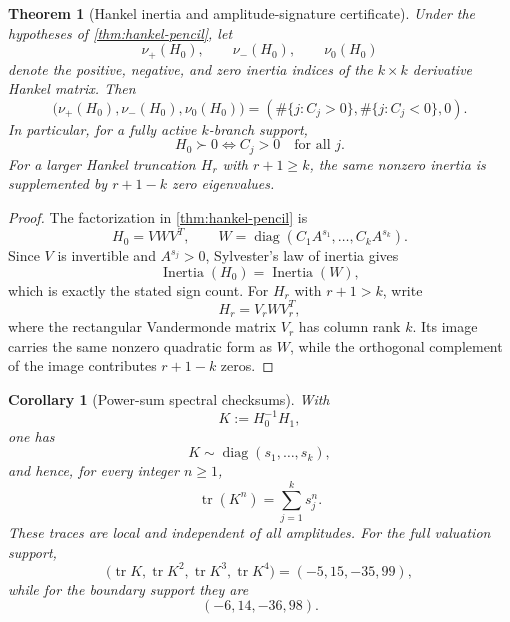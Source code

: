 \documentclass[aps,prd,reprint,onecolumn,nofootinbib,superscriptaddress,showkeys]{revtex4-2}
\numberwithin{equation}{section}
\theoremstyle{definition}
\theoremstyle{plain}
\newtheorem{theorem}{Theorem}[section]
\newtheorem{corollary}{Corollary}[section]
\newcommand{\diag}{\operatorname{diag}}
\begin{document}
\begin{theorem}[Hankel inertia and amplitude-signature certificate]\label{thm:hankel-inertia}
Under the hypotheses of \cref{thm:hankel-pencil}, let
\[
\nu_+(H_0),\qquad \nu_-(H_0),\qquad \nu_0(H_0)
\]
denote the positive, negative, and zero inertia indices of the $k\times k$ derivative Hankel matrix.  Then
\begin{equation}
\boxed{
\bigl(\nu_+(H_0),\nu_-(H_0),\nu_0(H_0)\bigr)
=
\left(
\#\{j:C_j>0\},
\#\{j:C_j<0\},
0
\right).
}
\end{equation}
In particular, for a fully active $k$-branch support,
\begin{equation}
\boxed{
H_0\succ0
\iff
C_j>0\quad\text{for all }j.
}
\end{equation}
For a larger Hankel truncation $H_r$ with $r+1\ge k$, the same nonzero inertia is supplemented by $r+1-k$ zero eigenvalues.
\end{theorem}

\begin{proof}
The factorization in \cref{thm:hankel-pencil} is
\[
H_0=VWV^T,
\qquad
W=\diag(C_1A^{s_1},\ldots,C_kA^{s_k}).
\]
Since $V$ is invertible and $A^{s_j}>0$, Sylvester's law of inertia gives
\[
\operatorname{Inertia}(H_0)=\operatorname{Inertia}(W),
\]
which is exactly the stated sign count.  For $H_r$ with $r+1>k$, write
\[
H_r=V_rWV_r^T,
\]
where the rectangular Vandermonde matrix $V_r$ has column rank $k$.  Its image carries the same nonzero quadratic form as $W$, while the orthogonal complement of the image contributes $r+1-k$ zeros.
\end{proof}

\begin{corollary}[Power-sum spectral checksums]\label{cor:spectral-traces}
With
\[
K:=H_0^{-1}H_1,
\]
one has
\begin{equation}
K\sim\diag(s_1,\ldots,s_k),
\end{equation}
and hence, for every integer $n\ge1$,
\begin{equation}
\boxed{
\operatorname{tr}(K^n)=\sum_{j=1}^k s_j^n.
}
\end{equation}
These traces are local and independent of all amplitudes.  For the full valuation support,
\begin{equation}
\bigl(\operatorname{tr}K,\operatorname{tr}K^2,
\operatorname{tr}K^3,\operatorname{tr}K^4\bigr)
=(-5,15,-35,99),
\end{equation}
while for the boundary support they are
\begin{equation}
(-6,14,-36,98).
\end{equation}
\end{corollary}
\end{document}
